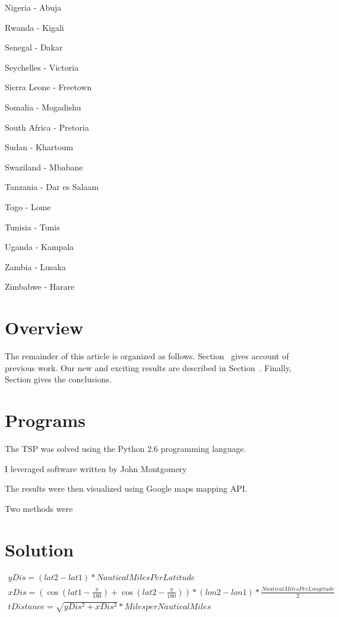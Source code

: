 \documentclass[12pt]{article}
\begin{document}
\begin{multicols}{3}
\begin{enumerate*}
\item Nigeria - Abuja
\item Rwanda - Kigali
\item Senegal - Dakar
\item Seychelles - Victoria
\item Sierra Leone - Freetown
\item Somalia - Mogadishu
\item South Africa - Pretoria 
\item Sudan - Khartoum
\item Swaziland - Mbabane
\item Tanzania - Dar es Salaam
\item Togo - Lome
\item Tunisia - Tunis
\item Uganda - Kampala
\item Zambia - Lusaka
\item Zimbabwe - Harare
\end{enumerate*}
\end{multicols}

\section{Overview}
The remainder of this article is organized as follows.
Section~ gives account of previous work.
Our new and exciting results are described in Section~.
Finally, Section gives the conclusions.

\section{Programs}

The TSP was solved using the Python 2.6 programming language.

I leveraged software written by John Montgomery \cite{cite_key2}

The results were then visualized using Google maps mapping API. 

Two methods were 

\section{Solution}

\begin{align}
  yDis = ( lat2 - lat1 ) * Nautical Miles Per Latitude\\
  xDis = ( \cos( lat1 - \frac{\pi}{180} ) + \cos( lat2 - \frac{\pi}{180} ) ) * ( lon2 - lon1 ) * \frac{Nautical Miles Per Longitude}{2}\\
  tDistance = \sqrt{ yDis^{2} + xDis^{2} } * Miles per Nautical Miles\\
\end{align}
\end{document}

